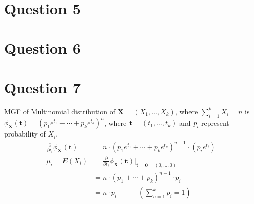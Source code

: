 \documentclass[11pt, fleqn]{article}
\begin{document}
\newpage
\section*{Question 5}
\setcounter{equation}{0}











\newpage
\section*{Question 6}
\setcounter{equation}{0}











\newpage
\section*{Question 7}
\setcounter{equation}{0}

MGF of Multinomial distribution of $\mathbf{X} = (X_1, \dots, X_k)$, where $\sum_{i=1}^{k} X_i = n$ is $\phi_{\mathbf{X}}(\mathbf{t}) = (p_1 e^{t_1} + \cdots + p_k e^{t_k})^{n}$, where $\mathbf{t} = (t_1, \dots, t_k)$ and $p_i$ represent probability of $X_i$. \\
\begin{equation*}
    \begin{split}
        \frac{\partial}{\partial t_i} \phi_{\mathbf{X}}(\mathbf{t}) &= n \cdot (p_1 e^{t_1} + \cdots + p_k e^{t_k})^{n-1} \cdot (p_i e^{t_i}) \\
        \mu_i = E(X_i) &= \frac{\partial}{\partial t_i} \phi_{\mathbf{X}}(\mathbf{t}) \bigg\rvert_{\mathbf{t} = \mathbf{0} = (0, \dots, 0)} \\
            &= n \cdot (p_1 + \cdots + p_k)^{n-1} \cdot p_i \\
            &= n \cdot p_i \hspace{3em} (\sum_{n=1}^{k} p_i = 1) 
    \end{split}
\end{equation*}
\end{document}
